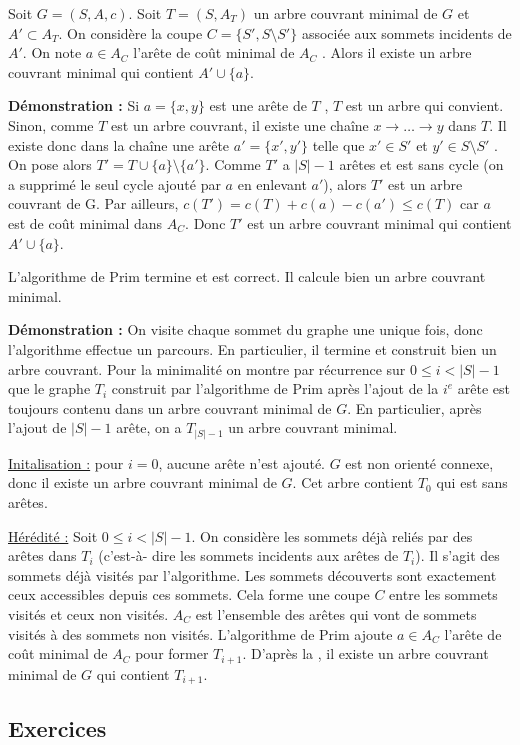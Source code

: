 \documentclass[../../../main.tex]{subfiles}
\begin{document}
 Soit $G = (S, A, c)$.
Soit $T = (S, A_T)$ un arbre couvrant minimal de $G$ et $A'\subset A_T$. On considère la coupe $C = \{S', S \setminus S'\}$
associée aux sommets incidents de $A'$. On note $a\in A_C$ l’arête de coût minimal de $A_C$ . Alors il existe
un arbre couvrant minimal qui contient $A'\cup \{a\}$.

\textbf{Démonstration :} Si $a = \{x, y\}$ est une arête de $T$ , $T$ est un arbre qui convient. Sinon, comme $T$ est
un arbre couvrant, il existe une chaîne $x\rightarrow \dots \rightarrow y$ dans $T$. Il existe donc dans la chaîne une arête
$a' = \{x' , y'\}$ telle que $x'\in S'$ et $y'\in S \setminus S'$ . On pose alors $T' = T\cup\{a\} \setminus \{a'\}$. Comme $T'$ a $|S| - 1$
arêtes et est sans cycle (on a supprimé le seul cycle ajouté par $a$ en enlevant $a'$), alors $T'$ est un arbre
couvrant de G. Par ailleurs, $c(T') = c(T) + c(a) - c(a') \leq c(T)$ car $a$ est de coût minimal dans $A_C$.\newline
Donc $T'$ est un arbre couvrant minimal qui contient $A'\cup \{a\}$.

 L’algorithme de Prim termine et est
correct. Il calcule bien un arbre couvrant minimal.

\textbf{Démonstration :} On visite chaque sommet du graphe une unique fois, donc l’algorithme effectue un
parcours. En particulier, il termine et construit bien un arbre couvrant. Pour la minimalité on montre
par récurrence sur $0 \leq i < |S| - 1$ que le graphe $T_i$ construit par l’algorithme de Prim après l’ajout de
la $i^e$ arête est toujours contenu dans un arbre couvrant minimal de $G$. En particulier, après l’ajout de
$|S| - 1$ arête, on a $T_{|S|-1}$ un arbre couvrant minimal.

\underline{Initalisation :} pour $i = 0$, aucune arête n’est ajouté. $G$ est non orienté connexe, donc il existe un arbre
couvrant minimal de $G$. Cet arbre contient $T_0$ qui est sans arêtes.

\underline{Hérédité :} Soit $0 \leq i < |S| - 1$. On considère les sommets déjà reliés par des arêtes dans $T_i$ (c’est-à-
dire les sommets incidents aux arêtes de $T_i$). Il s’agit des sommets déjà visités par l’algorithme. Les
sommets découverts sont exactement ceux accessibles depuis ces sommets. Cela forme une coupe $C$
entre les sommets visités et ceux non visités. $A_C$ est l’ensemble des arêtes qui vont de sommets visités
à des sommets non visités. L’algorithme de Prim ajoute $a\in A_C$ l’arête de coût minimal de $A_C$ pour
former $T_{i+1}$. D’après la , il existe un arbre couvrant minimal de $G$ qui contient $T_{i+1}$.
\subsection{Exercices}
\end{document}
